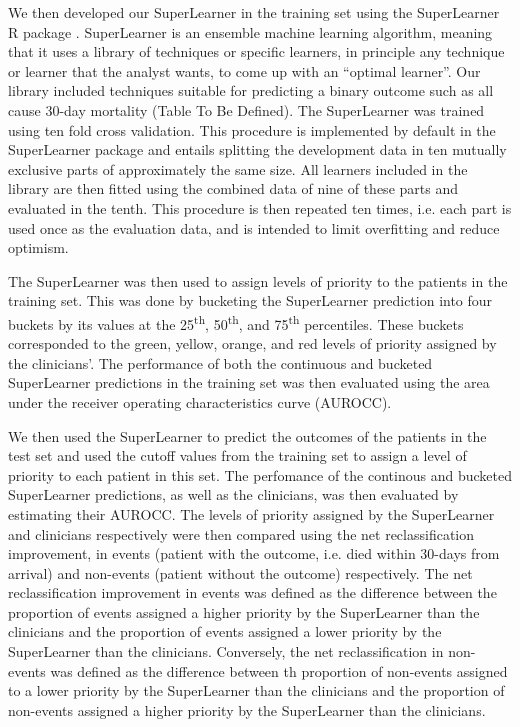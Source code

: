 \documentclass[10pt,letterpaper]{article}\usepackage[]{graphicx}\usepackage[]{color}
\begin{document}
We then developed our SuperLearner in the training set using the SuperLearner R
package \cite{SuperLearner}. SuperLearner is an ensemble machine learning
algorithm, meaning that it uses a library of techniques or specific learners, in
principle any technique or learner that the analyst wants, to come up with an
``optimal learner''. Our library included techniques suitable for predicting a
binary outcome such as all cause 30-day mortality (Table To Be Defined). The
SuperLearner was trained using ten fold cross validation. This procedure is
implemented by default in the SuperLearner package and entails splitting the
development data in ten mutually exclusive parts of approximately the same
size. All learners included in the library are then fitted using the combined
data of nine of these parts and evaluated in the tenth. This procedure is then
repeated ten times, i.e. each part is used once as the evaluation data, and is
intended to limit overfitting and reduce optimism.

The SuperLearner was then used to assign levels of priority to the patients in
the training set. This was done by bucketing the SuperLearner prediction into
four buckets by its values at the 25\textsuperscript{th},
50\textsuperscript{th}, and 75\textsuperscript{th} percentiles. These buckets
corresponded to the green, yellow, orange, and red levels of priority assigned
by the clinicians'. The performance of both the continuous and bucketed
SuperLearner predictions in the training set was then evaluated using the area
under the receiver operating characteristics curve (AUROCC).

We then used the SuperLearner to predict the outcomes of the patients in the
test set and used the cutoff values from the training set to assign a level of
priority to each patient in this set. The perfomance of the continous and
bucketed SuperLearner predictions, as well as the clinicians, was then evaluated
by estimating their AUROCC. The levels of priority assigned by the SuperLearner
and clinicians respectively were then compared using the net reclassification
improvement, in events (patient with the outcome, i.e. died within 30-days from
arrival) and non-events (patient without the outcome) respectively. The net
reclassification improvement in events was defined as the difference between the
proportion of events assigned a higher priority by the SuperLearner than the
clinicians and the proportion of events assigned a lower priority by the
SuperLearner than the clinicians. Conversely, the net reclassification in
non-events was defined as the difference between th proportion of non-events
assigned to a lower priority by the SuperLearner than the clinicians and the
proportion of non-events assigned a higher priority by the SuperLearner than the
clinicians.
\end{document}
